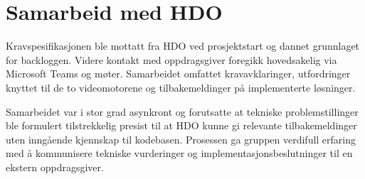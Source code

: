 \section{Samarbeid med HDO}

Kravspesifikasjonen ble mottatt fra HDO ved prosjektstart og dannet grunnlaget for backloggen. Videre kontakt med oppdragsgiver foregikk hovedsakelig via Microsoft Teams og møter. Samarbeidet omfattet kravavklaringer, utfordringer knyttet til de to videomotorene og tilbakemeldinger på implementerte løsninger.

Samarbeidet var i stor grad asynkront og forutsatte at tekniske problemstillinger ble formulert tilstrekkelig presist til at HDO kunne gi relevante tilbakemeldinger uten inngående kjennskap til kodebasen. Prosessen ga gruppen verdifull erfaring med å kommunisere tekniske vurderinger og implementasjonsbeslutninger til en ekstern oppdragsgiver.